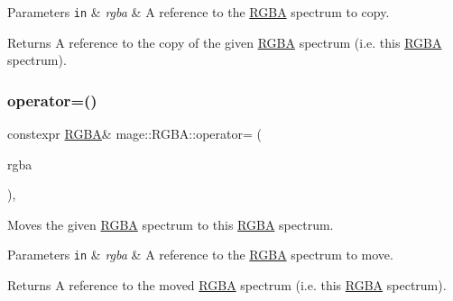 \begin{DoxyParams}[1]{Parameters}
\mbox{\tt in}  & {\em rgba} & A reference to the \hyperlink{structmage_1_1_r_g_b_a}{R\+G\+BA} spectrum to copy. \\
\hline
\end{DoxyParams}
\begin{DoxyReturn}{Returns}
A reference to the copy of the given \hyperlink{structmage_1_1_r_g_b_a}{R\+G\+BA} spectrum (i.\+e. this \hyperlink{structmage_1_1_r_g_b_a}{R\+G\+BA} spectrum). 
\end{DoxyReturn}
\hypertarget{structmage_1_1_r_g_b_a_a66f6476166086849d031b99b458e6f7c}{}\label{structmage_1_1_r_g_b_a_a66f6476166086849d031b99b458e6f7c} 
\subsubsection{\texorpdfstring{operator=()}{operator=()}\hspace{0.1cm}{\footnotesize\ttfamily [2/2]}}
{\footnotesize\ttfamily constexpr \hyperlink{structmage_1_1_r_g_b_a}{R\+G\+BA}\& mage\+::\+R\+G\+B\+A\+::operator= (\begin{DoxyParamCaption}\item[{\hyperlink{structmage_1_1_r_g_b_a}{R\+G\+BA} \&\&}]{rgba }\end{DoxyParamCaption})\hspace{0.3cm}{\ttfamily [default]}, {\ttfamily [noexcept]}}

Moves the given \hyperlink{structmage_1_1_r_g_b_a}{R\+G\+BA} spectrum to this \hyperlink{structmage_1_1_r_g_b_a}{R\+G\+BA} spectrum.


\begin{DoxyParams}[1]{Parameters}
\mbox{\tt in}  & {\em rgba} & A reference to the \hyperlink{structmage_1_1_r_g_b_a}{R\+G\+BA} spectrum to move. \\
\hline
\end{DoxyParams}
\begin{DoxyReturn}{Returns}
A reference to the moved \hyperlink{structmage_1_1_r_g_b_a}{R\+G\+BA} spectrum (i.\+e. this \hyperlink{structmage_1_1_r_g_b_a}{R\+G\+BA} spectrum). 
\end{DoxyReturn}
